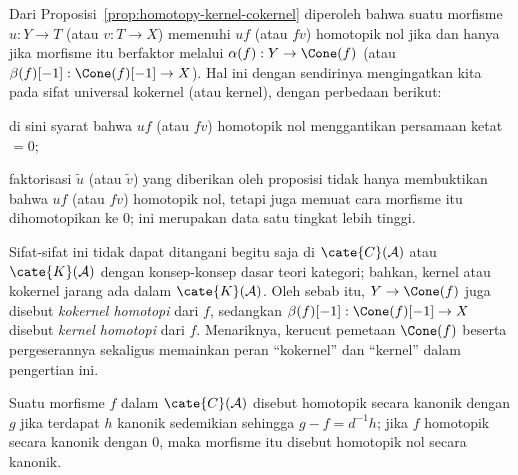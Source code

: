 \begin{catatan}\label{rem:homotopy-kernel-cokernel}
	Dari Proposisi~\ref{prop:homotopy-kernel-cokernel} diperoleh bahwa suatu
	morfisme $u:Y\to T$ (atau $v:T\to X$) memenuhi $uf$ (atau $fv$)
	homotopik nol jika dan hanya jika morfisme itu berfaktor melalui
	$\alpha(f):Y\to\Cone(f)$ (atau
	$\beta(f)[-1]:\Cone(f)[-1]\to X$). Hal ini dengan sendirinya mengingatkan
	kita pada sifat universal kokernel (atau kernel), dengan perbedaan berikut:
	\begin{compactitem}
		\item di sini syarat bahwa $uf$ (atau $fv$) homotopik nol menggantikan
		persamaan ketat $=0$;
		\item faktorisasi $\tilde{u}$ (atau $\tilde{v}$) yang diberikan oleh
		proposisi tidak hanya membuktikan bahwa $uf$ (atau $fv$) homotopik nol,
		tetapi juga memuat cara morfisme itu dihomotopikan ke $0$; ini merupakan
		data satu tingkat lebih tinggi.
	\end{compactitem}
	Sifat-sifat ini tidak dapat ditangani begitu saja di
	$\cate{C}(\mathcal{A})$ atau $\cate{K}(\mathcal{A})$ dengan konsep-konsep
	dasar teori kategori; bahkan, kernel atau kokernel jarang ada dalam
	$\cate{K}(\mathcal{A})$. Oleh sebab itu, $Y\to\Cone(f)$ juga disebut
	\emph{kokernel homotopi} dari $f$, sedangkan
	$\beta(f)[-1]:\Cone(f)[-1]\to X$ disebut \emph{kernel homotopi} dari $f$.
	Menariknya, kerucut pemetaan $\Cone(f)$ beserta pergeserannya sekaligus
	memainkan peran ``kokernel'' dan ``kernel'' dalam pengertian ini.
\end{catatan}

Suatu morfisme $f$ dalam $\cate{C}(\mathcal{A})$ disebut homotopik secara
kanonik dengan $g$ jika terdapat $h$ kanonik sedemikian sehingga
$g-f=d^{-1}h$; jika $f$ homotopik secara kanonik dengan $0$, maka morfisme
itu disebut homotopik nol secara kanonik.

